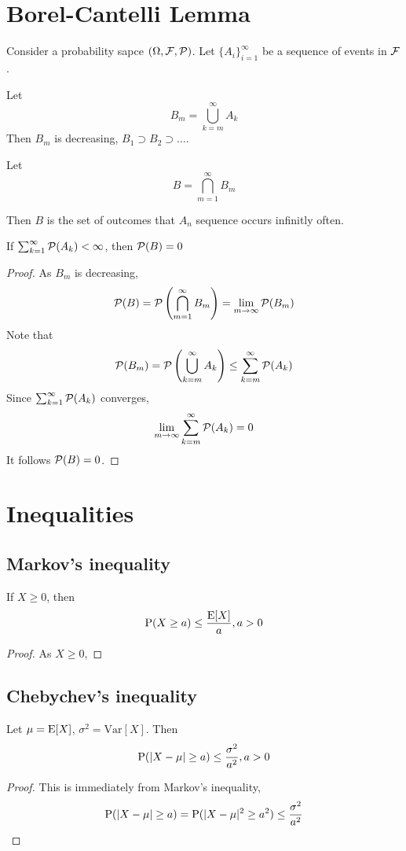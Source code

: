 \section{Borel-Cantelli Lemma}
Consider a probability sapce $(\Omega, \Fc, \Pc)$. Let $\{A_i\}_{i=1}^\infty$ be a sequence of events in $\Fc$.

Let
$$B_m = \bigcup_{k=m}^\infty A_k$$
Then $B_m$ is decreasing, $B_1 \supset B_2 \supset \ldots$. 

Let
$$B = \bigcap_{m=1}^\infty B_m$$

Then $B$ is the set of outcomes that $A_n$ sequence occurs infinitly often.
\begin{lemma}
If $\sum_{k=1}^\infty \Pc(A_k) < \infty$, then $\Pc(B) =0$
\end{lemma}
\begin{proof}
As $B_m$ is decreasing,
$$\Pc(B) = \Pc \left(\bigcap_{m=1}^\infty B_m \right) = \lim_{m\to \infty} \Pc(B_m)$$
Note that
$$\Pc(B_m) = \Pc\left(\bigcup_{k=m}^\infty A_k \right) \leq \sum_{k=m}^\infty \Pc(A_k)$$
Since $\sum_{k=1}^\infty \Pc(A_k)$ converges,
$$\lim_{m\to \infty} \sum_{k=m}^\infty \Pc(A_k) =0$$
It follows $\Pc(B) = 0 $.
\end{proof}

\section{Inequalities}
\subsection{Markov's inequality}
\begin{lemma}
If $X\geq 0$, then 
$$\P(X \geq a) \leq \frac{\E[X]}{a}, a >0$$
\end{lemma}
\begin{proof}
As $X\geq0$,
\end{proof}

\subsection{Chebychev's inequality}
\begin{lemma}
Let $\mu = \E[X]$, $\sigma^2 = \mathrm{Var}[X]$. Then
$$\P(|X-\mu|\geq a) \leq \frac{\sigma^2}{a^2}, a>0$$
\end{lemma}
\begin{proof}
This is immediately from Markov's inequality,
$$\P(|X-\mu|\geq a) =\P(|X-\mu|^2\geq a^2) \leq \frac{\sigma^2}{a^2}$$
\end{proof}


